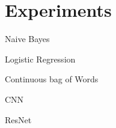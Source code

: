 \documentclass[11pt]{article}
\begin{document}
\section{Experiments}

\begin{subsection}{Naive Bayes}

\end{subsection}




\begin{subsection}{Logistic Regression}

\end{subsection}




\begin{subsection}{Continuous bag of Words}

\end{subsection}


\begin{subsection}{CNN}

\end{subsection}





\begin{subsection}{ResNet}

\end{subsection}






%
%
%
%
%
\end{document}
